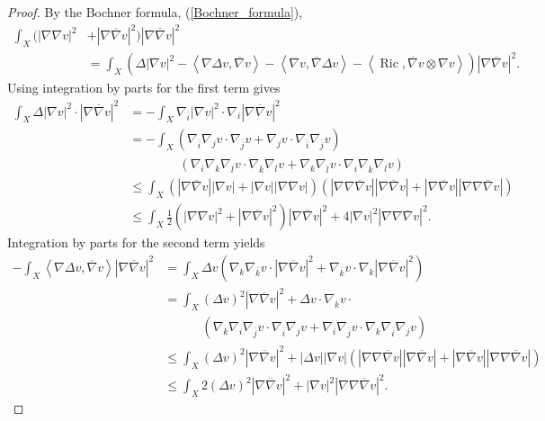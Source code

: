 \documentclass[12pt]{article}
\numberwithin{equation}{section}
\DeclareMathOperator{\Ric}{Ric}
\newcommand{\oo}[1]{\overline{#1}}
\newcommand{\ip}[1]{\left\langle#1\right\rangle}
\begin{document}
\begin{proof}
By the Bochner formula, (\ref{Bochner_formula}),
\begin{align*}
    \int_X (|\nabla \nabla v|^2 &+ |\nabla \oo{\nabla} v|^2) |\nabla \oo{\nabla} v|^2\\
    &= \int_X (\Delta |\nabla v|^2 - \ip{\nabla \Delta v, \oo{\nabla} v} - \ip{\nabla v, \oo{\nabla} \Delta v} - \ip{\Ric, \oo{\nabla} v \otimes \nabla v}) |\nabla \oo{\nabla} v|^2.
\end{align*}
Using integration by parts for the first term gives
\begin{align*}
    \int_X \Delta |\nabla v|^2 \cdot |\nabla \oo{\nabla} v|^2 &= -\int_X \nabla_{\oo{i}} |\nabla v|^2 \cdot \nabla_i |\nabla \oo{\nabla} v|^2\\
    &=  - \int_X (\nabla_{\oo{i}} \nabla_j v \cdot \nabla_{\oo{j}} v + \nabla_j v \cdot \nabla_{\oo{i}} \nabla_{\oo{j}} v)\\
    &\quad\quad\quad\quad(\nabla_i \nabla_k \nabla_{\oo{l}} v \cdot \nabla_{\oo{k}} \nabla_l v + \nabla_k \nabla_{\oo{l}}v \cdot \nabla_i \nabla_{\oo{k}} \nabla_l v)\\
    &\leq \int_X (|\nabla \oo{\nabla} v| |\nabla v| + |\nabla v| |\nabla \nabla v|)(|\nabla \nabla \oo{\nabla} v| |\nabla \oo{\nabla} v| + |\nabla \oo{\nabla} v| |\nabla \nabla \oo{\nabla} v|)\\
    &\leq \int_X \frac{1}{2}(|\nabla \nabla v|^2 + |\nabla \oo{\nabla} v|^2) |\nabla \oo{\nabla} v|^2 + 4 |\nabla v|^2 |\nabla \nabla \oo{\nabla} v|^2.
\end{align*}
Integration by parts for the second term yields
{\allowdisplaybreaks
\begin{align*}
    -\int_X \ip{\nabla \Delta v, \oo{\nabla} v} |\nabla \oo{\nabla} v|^2 &= \int_X \Delta v (\nabla_k \nabla_{\oo{k}} v \cdot |\nabla \oo{\nabla} v|^2 + \nabla_{\oo{k}} v \cdot \nabla_k |\nabla \oo{\nabla} v|^2)\\
    &= \int_X (\Delta v)^2 |\nabla \oo{\nabla} v|^2 + \Delta v \cdot \nabla_{\oo{k}} v \cdot\\
    &\quad\quad\quad(\nabla_k \nabla_i \nabla_{\oo{j}} v \cdot \nabla_{\oo{i}} \nabla_j v + \nabla_i \nabla_{\oo{j}} v \cdot \nabla_k \nabla_{\oo{i}} \nabla_j v)\\
    &\leq \int_X (\Delta v)^2 |\nabla\oo{\nabla} v|^2 + |\Delta v| |\nabla v| (|\nabla \nabla \oo{\nabla} v||\nabla \oo{\nabla} v| + |\nabla \oo{\nabla} v| |\nabla \nabla \oo{\nabla} v|)\\
    &\leq \int_X 2(\Delta v)^2 |\nabla \oo{\nabla} v|^2 + |\nabla v|^2 |\nabla\nabla \oo{\nabla} v|^2. 

\end{align*}}
\end{proof}
\end{document}
